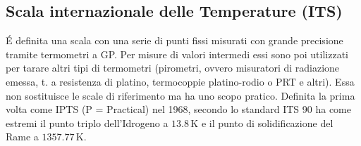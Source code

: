 \documentclass[10pt, oneside]{book}
\begin{document}
\subsection{Scala internazionale delle Temperature (ITS)}
\'E definita una scala con una serie di punti fissi misurati con grande precisione tramite termometri a GP. Per misure di valori intermedi essi sono poi utilizzati per tarare altri tipi di termometri (pirometri, ovvero misuratori di radiazione emessa, t. a resistenza di platino, termocoppie platino-rodio o PRT e altri). Essa non sostituisce le scale di riferimento ma ha uno scopo pratico. Definita la prima volta come IPTS (P = Practical) nel 1968, secondo lo standard ITS 90 ha come estremi il punto triplo dell'Idrogeno a $13.8 \, \mathrm{K}$ e il punto di solidificazione del Rame a $1357.77 \, \mathrm{K}$.
\end{document}
